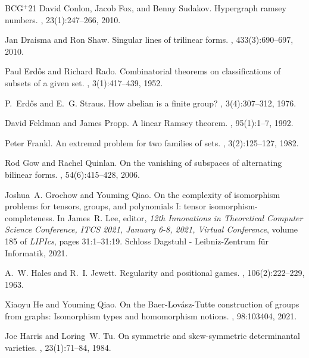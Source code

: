 \documentclass[10pt]{article}
\newcommand{\etalchar}[1]{$^{#1}$}
\begin{document}
\begin{thebibliography}{BCG{\etalchar{+}}21}
David Conlon, Jacob Fox, and Benny Sudakov.
\newblock Hypergraph ramsey numbers.
, 23(1):247--266,
  2010.

Jan Draisma and Ron Shaw.
\newblock Singular lines of trilinear forms.
, 433(3):690--697, 2010.

Paul Erd\H{o}s and Richard Rado.
\newblock Combinatorial theorems on classifications of subsets of a given set.
, 3(1):417--439,
  1952.

P.~Erd\H{o}s and E.~G. Straus.
\newblock How abelian is a finite group?
, 3(4):307--312, 1976.

David Feldman and James Propp.
\newblock A linear {Ramsey} theorem.
, 95(1):1--7, 1992.

Peter Frankl.
\newblock An extremal problem for two families of sets.
, 3(2):125--127, 1982.

Rod Gow and Rachel Quinlan.
\newblock On the vanishing of subspaces of alternating bilinear forms.
, 54(6):415--428, 2006.

Joshua~A. Grochow and Youming Qiao.
\newblock On the complexity of isomorphism problems for tensors, groups, and
  polynomials {I:} tensor isomorphism-completeness.
\newblock In James~R. Lee, editor, {\em 12th Innovations in Theoretical
  Computer Science Conference, {ITCS} 2021, January 6-8, 2021, Virtual
  Conference}, volume 185 of {\em LIPIcs}, pages 31:1--31:19. Schloss Dagstuhl
  - Leibniz-Zentrum f{\"{u}}r Informatik, 2021.

A.~W. Hales and R.~I. Jewett.
\newblock Regularity and positional games.
,
  106(2):222--229, 1963.

Xiaoyu He and Youming Qiao.
\newblock On the Baer-Lov{\'{a}}sz-Tutte construction of groups from graphs:
  Isomorphism types and homomorphism notions.
, 98:103404, 2021.

Joe Harris and Loring~W. Tu.
\newblock On symmetric and skew-symmetric determinantal varieties.
, 23(1):71--84, 1984.


\end{thebibliography}
\end{document}
